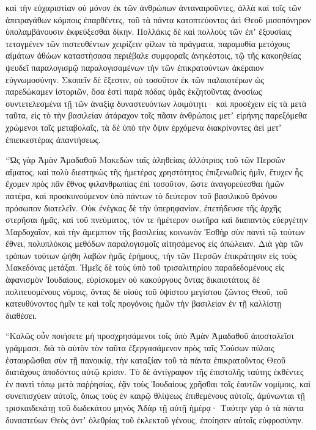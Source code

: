 {καὶ τὴν εὐχαριστίαν οὐ μόνον ἐκ τῶν ἀνθρώπων ἀνταναιροῦντες, ἀλλὰ καὶ τοῖς τῶν ἀπειραγάθων κόμποις ἐπαρθέντες, τοῦ τὰ πάντα κατοπτεύοντος ἀεὶ Θεοῦ μισοπόνηρον ὑπολαμβάνουσιν ἐκφεύξεσθαι δίκην.
Πολλάκις δὲ καὶ πολλοὺς τῶν ἐπʼ ἐξουσίαις τεταγμένεν τῶν πιστευθέντων χειρίζειν φίλων τὰ πράγματα, παραμυθία μετόχους αἱμάτων ἀθώων καταστήσασα περιέβαλε συμφοραῖς ἀνηκέστοις,
τῷ τῆς κακοηθείας ψευδεῖ παραλογισμῷ παραλογισαμένων τὴν τῶν ἐπικρατούντων ἀκέραιον εὐγνωμοσύνην.
Σκοπεῖν δὲ ἔξεστιν, οὐ τοσοῦτον ἐκ τῶν παλαιοτέρων ὡς παρεδώκαμεν ἱστοριῶν, ὅσα ἐστὶ παρὰ πόδας ὑμᾶς ἐκζητοῦντας ἀνοσίως συντετελεσμένα τῇ τῶν ἀναξίᾳ δυναστευόντων λοιμότητι·
καὶ προσέχειν εἰς τὰ μετὰ ταῦτα, εἰς τὸ τὴν βασιλείαν ἀτάραχον τοῖς πᾶσιν ἀνθρώποις μετʼ εἰρήνης παρεξόμεθα
χρώμενοι ταῖς μεταβολαῖς, τὰ δὲ ὑπὸ τὴν ὄψιν ἐρχόμενα διακρίνοντες ἀεὶ μετʼ ἐπιεικεστέρας ἀπαντήσεως.
\par }{\PP {}“Ὡς γὰρ Ἀμὰν Ἀμαδαθοῦ Μακεδὼν ταῖς ἀληθείαις ἀλλότριος τοῦ τῶν Περσῶν αἵματος, καὶ πολὺ διεστηκὼς τῆς ἡμετέρας χρηστότητος ἐπιξενωθεὶς ἡμῖν,
ἔτυχεν ἧς ἔχομεν πρὸς πᾶν ἔθνος φιλανθρωπίας ἐπὶ τοσοῦτον, ὥστε ἀναγορεύεσθαι ἡμῶν πατέρα, καὶ προσκυνούμενον ὑπὸ πάντων τὸ δεύτερον τοῦ βασιλικοῦ θρόνου πρόσωπον διατελεῖν.
Οὐκ ἐνέγκας δὲ τὴν ὑπερηφανίαν, ἐπετήδευσε τῆς ἀρχῆς στερῆσαι ἡμᾶς, καὶ τοῦ πνεύματος,
τόν τε ἡμέτερον σωτῆρα καὶ διαπαντὸς εὐεργέτην Μαρδοχαῖον, καὶ τὴν ἄμεμπτον τῆς βασιλείας κοινωνὸν Ἐσθὴρ σὺν παντὶ τῷ τούτων ἔθνει, πολυπλόκοις μεθόδων παραλογισμοῖς αἰτησάμενος εἰς ἀπώλειαν.
Διὰ γὰρ τῶν τρόπων τούτων ᾠήθη λαβὼν ἡμᾶς ἐρήμους, τὴν τῶν Περσῶν ἐπικράτησιν εἰς τοὺς Μακεδόνας μετάξαι.
Ἡμεῖς δὲ τοὺς ὑπὸ τοῦ τρισαλιτηρίου παραδεδομένους εἰς ἀφανισμὸν Ἰουδαίους, εὑρίσκομεν οὐ κακούργους ὄντας δικαιοτάτοις δὲ πολιτευομένους νόμοις,
ὄντας δὲ υἱοὺς τοῦ ὑψίστου μεγίστου ζῶντος Θεοῦ, τοῦ κατευθύνοντος ἡμῖν τε καὶ τοῖς προγόνοις ἡμῶν τὴν βασιλείαν ἐν τῇ καλλίστῃ διαθέσει.
\par }{\PP {}“Καλῶς οὖν ποιήσετε μὴ προσχρησάμενοι τοῖς ὑπὸ Ἀμὰν Ἀμαδαθοῦ ἀποσταλεῖσι γράμμασι, διὰ τὸ αὐτὸν τὸν ταῦτα ἐξεργασάμενον πρὸς ταῖς Σούσων πύλαις ἐσταυρῶσθαι σὺν τῇ πανοικίᾳ, τὴν καταξίαν τοῦ τὰ πάντα ἐπικρατοῦντος Θεοῦ διατάχους ἀποδόντος αὐτῷ κρίσιν.
Τὸ δὲ ἀντίγραφον τῆς ἐπιστολῆς ταύτης ἐκθέντες ἐν παντὶ τόπῳ μετὰ παῤῥησίας, ἐᾷν τοὺς Ἰουδαίους χρῆσθαι τοῖς ἑαυτῶν νομίμοις, καὶ συνεπισχύειν αὐτοῖς, ὅπως τοὺς ἐν καιρῷ θλίψεως ἐπιθεμένους αὐτοῖς, ἀμύνωνται τῇ τρισκαιδεκάτῃ τοῦ δωδεκάτου μηνὸς Ἀδὰρ τῇ αὐτῇ ἡμέρᾳ·
Ταύτην γὰρ ὁ τὰ πάντα δυναστεύων Θεὸς ἀντʼ ὀλεθρίας τοῦ ἐκλεκτοῦ γένους, ἐποίησεν αὐτοῖς εὐφροσύνην.
}
